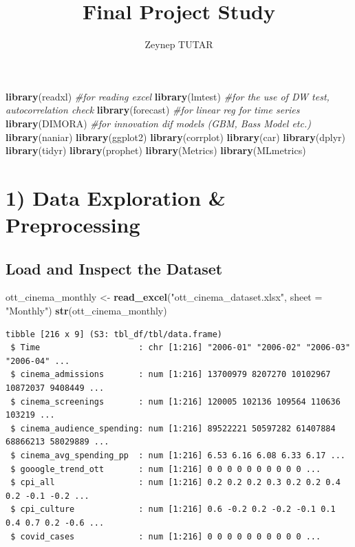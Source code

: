 \documentclass[
]{article}
\title{Final Project Study}
\author{Zeynep TUTAR}
\date{}
\newenvironment{Shaded}{\begin{snugshade}}{\end{snugshade}}
\newcommand{\AttributeTok}[1]{\textcolor[rgb]{0.13,0.29,0.53}{#1}}
\newcommand{\CommentTok}[1]{\textcolor[rgb]{0.56,0.35,0.01}{\textit{#1}}}
\newcommand{\FunctionTok}[1]{\textcolor[rgb]{0.13,0.29,0.53}{\textbf{#1}}}
\newcommand{\NormalTok}[1]{#1}
\newcommand{\OtherTok}[1]{\textcolor[rgb]{0.56,0.35,0.01}{#1}}
\newcommand{\StringTok}[1]{\textcolor[rgb]{0.31,0.60,0.02}{#1}}
\begin{document}
\maketitle

\begin{Shaded}
\begin{Highlighting}[]
\FunctionTok{library}\NormalTok{(readxl)  }\CommentTok{\#for reading excel}
\FunctionTok{library}\NormalTok{(lmtest)  }\CommentTok{\#for the use of DW test, autocorrelation check}
\FunctionTok{library}\NormalTok{(forecast)  }\CommentTok{\#for linear reg for time series}
\FunctionTok{library}\NormalTok{(DIMORA)  }\CommentTok{\#for innovation dif models (GBM, Bass Model etc.)}
\FunctionTok{library}\NormalTok{(naniar)}
\FunctionTok{library}\NormalTok{(ggplot2)}
\FunctionTok{library}\NormalTok{(corrplot)}
\FunctionTok{library}\NormalTok{(car)}
\FunctionTok{library}\NormalTok{(dplyr)}
\FunctionTok{library}\NormalTok{(tidyr)}
\FunctionTok{library}\NormalTok{(prophet)}
\FunctionTok{library}\NormalTok{(Metrics)}
\FunctionTok{library}\NormalTok{(MLmetrics)}
\end{Highlighting}
\end{Shaded}

\section{1) Data Exploration \&
Preprocessing}\label{data-exploration-preprocessing}

\subsection{Load and Inspect the
Dataset}\label{load-and-inspect-the-dataset}

\begin{Shaded}
\begin{Highlighting}[]
\NormalTok{ott\_cinema\_monthly }\OtherTok{\textless{}{-}} \FunctionTok{read\_excel}\NormalTok{(}\StringTok{"ott\_cinema\_dataset.xlsx"}\NormalTok{, }\AttributeTok{sheet =} \StringTok{"Monthly"}\NormalTok{)}
\FunctionTok{str}\NormalTok{(ott\_cinema\_monthly)}
\end{Highlighting}
\end{Shaded}

\begin{verbatim}
tibble [216 x 9] (S3: tbl_df/tbl/data.frame)
 $ Time                    : chr [1:216] "2006-01" "2006-02" "2006-03" "2006-04" ...
 $ cinema_admissions       : num [1:216] 13700979 8207270 10102967 10872037 9408449 ...
 $ cinema_screenings       : num [1:216] 120005 102136 109564 110636 103219 ...
 $ cinema_audience_spending: num [1:216] 89522221 50597282 61407884 68866213 58029889 ...
 $ cinema_avg_spending_pp  : num [1:216] 6.53 6.16 6.08 6.33 6.17 ...
 $ gooogle_trend_ott       : num [1:216] 0 0 0 0 0 0 0 0 0 0 ...
 $ cpi_all                 : num [1:216] 0.2 0.2 0.2 0.3 0.2 0.2 0.4 0.2 -0.1 -0.2 ...
 $ cpi_culture             : num [1:216] 0.6 -0.2 0.2 -0.2 -0.1 0.1 0.4 0.7 0.2 -0.6 ...
 $ covid_cases             : num [1:216] 0 0 0 0 0 0 0 0 0 0 ...
\end{verbatim}
\end{document}
